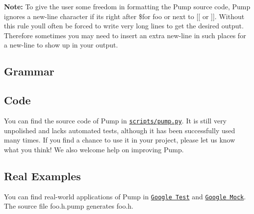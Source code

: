 {\bfseries Note\+:} To give the user some freedom in formatting the Pump source code, Pump ignores a new-\/line character if it\textquotesingle{}s right after {\ttfamily \$for foo} or next to {\ttfamily \mbox{[}\mbox{[}} or {\ttfamily \mbox{]}\mbox{]}}. Without this rule you\textquotesingle{}ll often be forced to write very long lines to get the desired output. Therefore sometimes you may need to insert an extra new-\/line in such places for a new-\/line to show up in your output.

\subsection*{Grammar}




\subsection*{Code}

You can find the source code of Pump in \href{http://code.google.com/p/googletest/source/browse/trunk/scripts/pump.py}{\tt scripts/pump.\+py}. It is still very unpolished and lacks automated tests, although it has been successfully used many times. If you find a chance to use it in your project, please let us know what you think! We also welcome help on improving Pump.

\subsection*{Real Examples}

You can find real-\/world applications of Pump in \href{http://www.google.com/codesearch?q=file%3A\.pump%24+package%3Ahttp%3A%2F%2Fgoogletest\.googlecode\.com}{\tt Google Test} and \href{http://www.google.com/codesearch?q=file%3A\.pump%24+package%3Ahttp%3A%2F%2Fgooglemock\.googlecode\.com}{\tt Google Mock}. The source file {\ttfamily foo.\+h.\+pump} generates {\ttfamily foo.\+h}.

